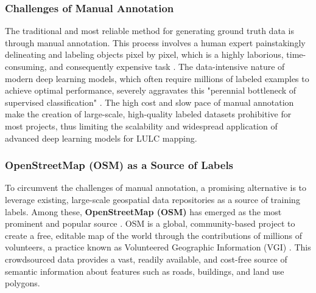 \documentclass{report}
\begin{document}
\subsubsection{Challenges of Manual Annotation}
The traditional and most reliable method for generating ground truth data is through manual annotation. This process involves a human expert painstakingly delineating and labeling objects pixel by pixel, which is a highly laborious, time-consuming, and consequently expensive task \parencites[p.~1;]{KaiserEtAlLearningAerialImageSegmentationOnlineMaps2017}[p.~1f.]{UsmaniEtAlglobalscalesegmentationOpenStreetMapremotesensing2023}. The data-intensive nature of modern deep learning models, which often require millions of labeled examples to achieve optimal performance, severely aggravates this "perennial bottleneck of supervised classification" \parencites[p.~1]{KaiserEtAlLearningAerialImageSegmentationOnlineMaps2017}. The high cost and slow pace of manual annotation make the creation of large-scale, high-quality labeled datasets prohibitive for most projects, thus limiting the scalability and widespread application of advanced deep learning models for LULC mapping.
\subsubsection{OpenStreetMap (OSM) as a Source of Labels}
To circumvent the challenges of manual annotation, a promising alternative is to leverage existing, large-scale geospatial data repositories as a source of training labels. Among these, \textbf{OpenStreetMap (OSM)} has emerged as the most prominent and popular source \parencites[p.~1f.]{UsmaniEtAlRemoteSensingDeepLearningUnderstandNoisyOpenStreetMap2023}. OSM is a global, community-based project to create a free, editable map of the world through the contributions of millions of volunteers, a practice known as Volunteered Geographic Information (VGI) \parencites[p.~1f.;]{DengNewsamQuantitativeComparisonOpenSourceDataFineGrainMappingLandUse2017}[p.~1]{KaiserEtAlLearningAerialImageSegmentationOnlineMaps2017}. This crowdsourced data provides a vast, readily available, and cost-free source of semantic information about features such as roads, buildings, and land use polygons.\par
\end{document}
